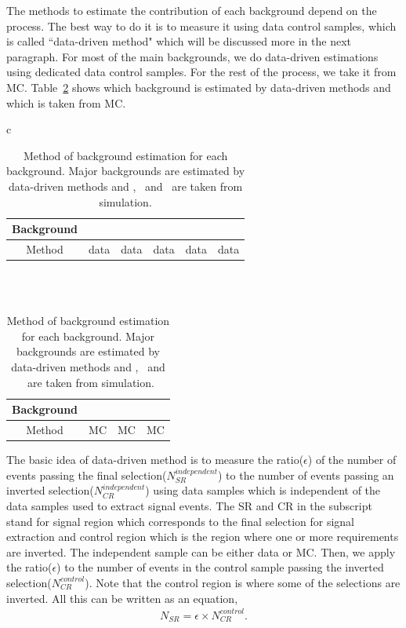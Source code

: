 The methods to estimate the contribution of each background depend on the process. 
The best way to do it is to measure it using data control samples, which is 
called ``data-driven method" which will be discussed more in the next paragraph. 
For most of the main backgrounds, we do data-driven estimations using dedicated
data control samples. For the rest of the process, we take it from MC.
Table~\ref{tab:overview_bkgest} shows which background is estimated by 
data-driven methods and which is taken from MC. 

%
\begin{table}[htp] 
\begin{center} 
\vspace{0.5cm}
\begin{tabular}{c}   

\begin{tabular}{c|c|c|c|c|c}   
\hline 
Background     & \qqww & \topbkg & \dyll & \Wjets & \wgammastar  \\
\hline 
\hline 
Method         & data & data & data & data & data \\ 
\hline 
\end{tabular} 
\\
\\
\begin{tabular}{c|c|c|c}   
\hline 
Background     & \ggww & \wgamma & \vv \\
\hline 
\hline 
Method         & MC & MC & MC \\ 
\hline 
\end{tabular} 

\end{tabular} 

\vspace{0.5cm}
\caption{Method of background estimation for each background. Major backgrounds 
are estimated by data-driven methods and  \ggww,  \wgamma\ and  \vv\ are taken 
from simulation.} 
\label{tab:overview_bkgest} 
\end{center} 
\end{table} 

The basic idea of data-driven method is to measure the ratio($\epsilon$) of the number of events  
passing the final selection($N_{SR}^{independent}$) to the number of events passing an inverted 
selection($N_{CR}^{independent}$) using data samples which is independent of the data samples 
used to extract signal events. The SR and CR in the subscript stand for signal region 
which corresponds to the final selection for signal extraction 
and control region which is the region where one or more requirements are inverted. 
The independent sample can be either data or MC. Then, we apply the ratio($\epsilon$)
to the number of events in the control sample passing the inverted selection($N_{CR}^{control}$).
Note that the control region is where some of the selections are inverted. 
All this can be written as an equation, 
\begin{eqnarray} 
N_{SR} = \epsilon \times N_{CR}^{control}.
\end{eqnarray} 

